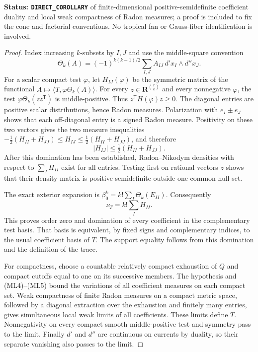 \documentclass[11pt,a4paper]{article}
\numberwithin{equation}{section}
\theoremstyle{definition}
\theoremstyle{remark}
\begin{document}
\noindent\textbf{Status: \texttt{DIRECT\_COROLLARY}} of
finite-dimensional positive-semidefinite coefficient duality and
local weak compactness of Radon measures; a proof is included to
fix the cone and factorial conventions.  No tropical fan or
Gauss-fiber identification is involved.

\begin{proof}
Index increasing $k$-subsets by $I,J$ and use the middle-square
convention
\[
 \Theta_k(A)=(-1)^{k(k-1)/2}
        \sum_{I,J}A_{IJ}\,d'x_I\wedge d''x_J.
\]
For a scalar compact test $\varphi$, let $H_{IJ}(\varphi)$ be
the symmetric matrix of the functional
$A\mapsto\langle T,\varphi\Theta_k(A)\rangle$.
For every $z\in\mathbf R^{\binom rk}$ and every nonnegative
$\varphi$, the test $\varphi\Theta_k(zz^{\mathsf T})$ is
middle-positive.  Thus $z^{\mathsf T}H(\varphi)z\ge0$.
The diagonal entries are positive scalar distributions, hence
Radon measures.  Polarization with $e_I\pm e_J$ shows that each
off-diagonal entry is a signed Radon measure.  Positivity on these
two vectors gives the two measure inequalities
$-\tfrac12(H_{II}+H_{JJ})\le H_{IJ}\le
\tfrac12(H_{II}+H_{JJ})$, and therefore
\[
 |H_{IJ}|\le\tfrac12(H_{II}+H_{JJ}).
 \tag{ML4}
\]
After this domination has been established, Radon--Nikodym
densities with respect to $\sum_IH_{II}$ exist for all entries.
Testing first on rational vectors $z$ shows that their density
matrix is positive semidefinite outside one common null set.

The exact exterior expansion is
$\beta_0^k=k!\sum_I\Theta_k(E_{II})$.  Consequently
\[
                         \nu_T=k!\sum_IH_{II}.
 \tag{ML5}
\]
This proves order zero and domination of every coefficient in the
complementary test basis.  That basis is equivalent, by fixed signs
and complementary indices, to the usual coefficient basis of $T$.
The support equality follows from this domination and the definition
of the trace.

For compactness, choose a countable relatively compact exhaustion of
$Q$ and compact cutoffs equal to one on its successive members.
The hypothesis and \textup{(ML4)--(ML5)} bound the variations of all
coefficient measures on each compact set.  Weak compactness of
finite Radon measures on a compact metric space, followed by a
diagonal extraction over the exhaustion and finitely many entries,
gives simultaneous local weak limits of all coefficients.  These
limits define $T$.  Nonnegativity on every compact smooth
middle-positive test and symmetry pass to the limit.  Finally
$d'$ and $d''$ are continuous on currents by duality, so their
separate vanishing also passes to the limit.
\end{proof}
\end{document}
